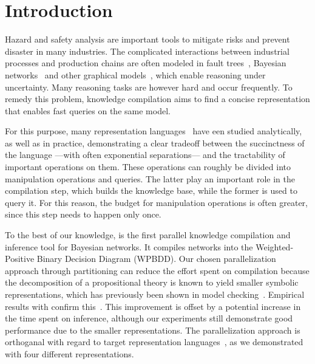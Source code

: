 
\section{Introduction}
\label{sec:introduction}

Hazard and safety analysis are important tools to mitigate risks and prevent disaster in many industries. The complicated interactions between industrial processes and production chains are often modeled in fault trees~\cite{sokukcu2022risk}, Bayesian networks~\cite{pearl2011bayesian} and other graphical models~\cite{kollerfriedman2009,darwiche2022complete}, which enable reasoning under uncertainty.
Many reasoning tasks are however hard and occur frequently. To remedy this problem, knowledge compilation aims to find a concise representation that enables fast queries on the same model.

For this purpose, many representation languages~\cite{chavira2008probabilistic,darwiche2011sdd,hitzler2022tractable,sanner2005affine,tafertshofer1997factored} have een studied analytically, as well as in practice, demonstrating a clear tradeoff between the succinctness of the language ---with often exponential separations--- and the tractability of important operations on them. These operations can roughly be divided into manipulation operations and queries. The latter play an important role in the compilation step, which builds the knowledge base, while the former is used to query it. For this reason, the budget for manipulation operations is often greater, since this step needs to happen only once.

To the best of our knowledge, \toolname is the first parallel knowledge compilation and inference tool for Bayesian networks. It compiles networks into the Weighted-Positive Binary Decision Diagram (WPBDD). Our chosen parallelization approach through partitioning can reduce the effort spent on compilation because the decomposition of a propositional theory is known to yield smaller symbolic representations, which has previously been shown in model checking~\cite{narayan1996partitioned,sahoo2004partitioning,darwiche2021quantifying,darwiche2022complete}. Empirical results with \toolname confirm this~\cite{dal2017reducing}.
 This improvement is offset by a potential increase in the time spent on inference, although our experiments still demonstrate good performance due to the smaller representations. The parallelization approach is orthoganal with regard to target representation languages~\cite{dal2018parallel}, as we demonstrated with four different representations.

